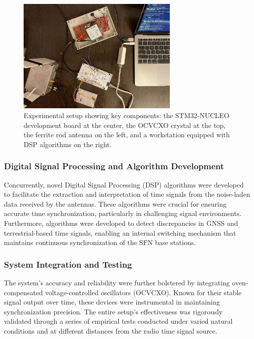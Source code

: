 \documentclass[12pt, a4paper]{extarticle}
\begin{document}
\begin{figure}[H] \centering
    \includegraphics[width=0.7\textwidth]{setup-mess.jpg}
    \captionsetup{width=0.9\textwidth}
    \caption{Experimental setup showing key components: the STM32-NUCLEO
    development board at the center, the OCVCXO crystal at the top, the ferrite
    rod antenna on the left, and a workstation equipped with DSP algorithms on
    the right.}
    \label{fig:setup-mess}
\end{figure}

\subsubsection*{Digital Signal Processing and Algorithm Development}

Concurrently, novel Digital Signal Processing (DSP) algorithms were developed
to facilitate the extraction and interpretation of time signals from the
noise-laden data received by the antennas. These algorithms were crucial for
ensuring accurate time synchronization, particularly in challenging signal
environments. Furthermore, algorithms were developed to detect discrepancies in
GNSS and terrestrial-based time signals, enabling an internal switching
mechanism that maintains continuous synchronization of the SFN base stations.

\subsubsection*{System Integration and Testing}

The system's accuracy and reliability were further bolstered by integrating
oven-compensated voltage-controlled oscillators (OCVCXO). Known for their
stable signal output over time, these devices were instrumental in maintaining
synchronization precision. The entire setup's effectiveness was rigorously
validated through a series of empirical tests conducted under varied natural
conditions and at different distances from the radio time signal source.
\end{document}
